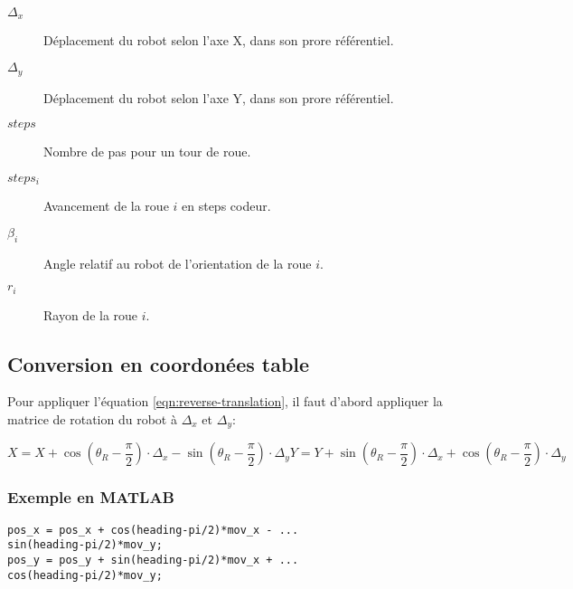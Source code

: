 \documentclass[a4paper]{paper}
\begin{document}
\begin{description}
    \item[$\Delta_x$] Déplacement du robot selon l'axe X, dans son prore référentiel.
    \item[$\Delta_y$] Déplacement du robot selon l'axe Y, dans son prore référentiel.
    \item[$steps$] Nombre de pas pour un tour de roue.
    \item[$steps_i$] Avancement de la roue $i$ en steps codeur.
    \item[$\beta_i$] Angle relatif au robot de l'orientation de la roue $i$.
    \item[$r_i$] Rayon de la roue $i$.
\end{description}

\subsection{Conversion en coordonées table}
Pour appliquer l'équation \eqref{eqn:reverse-translation}, il faut d'abord appliquer
la matrice de rotation du robot à $\Delta_x$ et $\Delta_y$:

\begin{subequations}
    \begin{equation}
        X = X + \cos \left( \theta_R - \frac{\pi}{2} \right) \cdot \Delta_x - \sin \left( \theta_R - \frac{\pi}{2} \right) \cdot \Delta_y
    \end{equation}
    \begin{equation} 
        Y = Y + \sin \left( \theta_R - \frac{\pi}{2} \right) \cdot \Delta_x + \cos \left( \theta_R - \frac{\pi}{2} \right) \cdot \Delta_y
    \end{equation} 
    \label{eqn:coordinate-transform}
\end{subequations}

\subsubsection{Exemple en MATLAB}
\begin{lstlisting}
pos_x = pos_x + cos(heading-pi/2)*mov_x - ...
sin(heading-pi/2)*mov_y;
pos_y = pos_y + sin(heading-pi/2)*mov_x + ...
cos(heading-pi/2)*mov_y;
\end{lstlisting}
\end{document}
